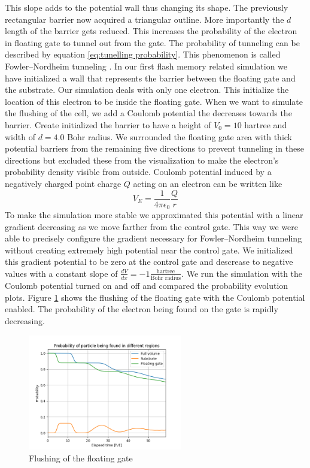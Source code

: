This slope adds to the potential wall thus changing its shape.
The previously rectangular barrier now acquired a triangular outline. More importantly the $d$ length of the barrier gets reduced.
This increases the probability of the electron in floating gate to tunnel out from the gate. The probability of tunneling can be described by equation \ref{eq:tunelling probability}.
This phenomenon is called Fowler–Nordheim tunneling \cite{Fowler_1928bv}.
In our first flash memory related simulation we have initialized a wall that represents the barrier between the floating gate and the substrate.
Our simulation deals with only one electron.
This initialize the location of this electron to be inside the floating gate.
When we want to simulate the flushing of the cell, we add a Coulomb potential the decreases towards the barrier.
Create initialized the barrier to have a height of $V_0 = 10$ hartree and width of $d = 4.0$ Bohr radius.
We surrounded the floating gate area with thick potential barriers from the remaining five directions to prevent tunneling in these directions but excluded these from the visualization to make the electron's probability density visible from outside.
Coulomb potential induced by a negatively charged point charge $Q$ acting on an electron can be written like
\begin{equation}
	\label{eq:coulomb_potential}
	V_E = \frac{1}{4\pi \epsilon_0}\frac{Q}{r}
\end{equation}
To make the simulation more stable we approximated this potential with a linear gradient decreasing as we move farther from the control gate.
This way we were able to precisely configure the gradient necessary for Fowler–Nordheim tunneling without creating extremely high potential near the control gate.
We initialized this gradient potential to be zero at the control gate and descrease to negative values with a constant slope of $\frac{dV}{dx}=-1\frac{\text{hartree}}{\text{Bohr radius}}$.
We run the simulation with the Coulomb potential turned on and off and compared the probability evolution plots.
Figure \ref{fig:flash_flush_plot} shows the flushing of the floating gate with the Coulomb potential enabled.
The probability of the electron being found on the gate is rapidly decreasing.
\begin{figure}
	\centering
	\includegraphics[width=0.6\textwidth]{figures/flash_flush.png}
	\caption{Flushing of the floating gate}
	\label{fig:flash_flush_plot}
\end{figure}
